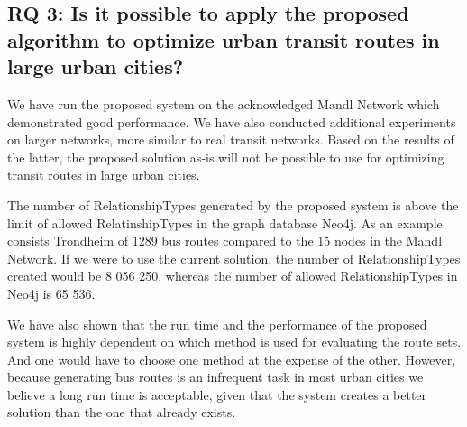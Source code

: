  



\subsection*{RQ 3: Is it possible to apply the proposed algorithm to optimize urban transit routes in large urban cities?}

We have run the proposed system on the acknowledged Mandl Network which demonstrated good performance. We have also conducted additional experiments on larger networks, more similar to real transit networks. Based on the results of the latter, the proposed solution as-is will not be possible to use for optimizing transit routes in large urban cities. \newline

The number of RelationshipTypes generated by the proposed system is above the limit of allowed RelatinshipTypes in the graph database Neo4j. As an example consists Trondheim of 1289 bus routes compared to the 15 nodes in the Mandl Network. If we were to use the current solution, the number of RelationshipTypes created would be 8 056 250, whereas the number of allowed RelationshipTypes in Neo4j is 65 536. \newline

We have also shown that the run time and the performance of the proposed system is highly dependent on which method is used for evaluating the route sets. And one would have to choose one method at the expense of the other. However, because generating bus routes is an infrequent task in most urban cities we believe a long run time is acceptable, given that the system creates a better solution than the one that already exists. 

